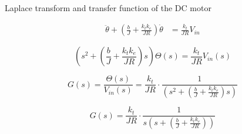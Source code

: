 \subsection{}
{
\begin{frame}{Laplace transform and transfer function of the DC motor}

\begin{equation*}
\begin{split}
\ddot{ \theta} + (\frac{b}{J} + \frac{ k_t k_e }{JR} ) \dot \theta & = \frac{k_t}{JR} V_{in}
\end{split}
\end{equation*}


\begin{equation*}
\left( s^2 + (\frac{b}{J} + \frac{ k_t k_e }{JR})s \right) \Theta(s) =  \frac{k_t}{JR} V_{in}(s)
\end{equation*}


\begin{equation*}
G(s)= \frac{\Theta(s)}{V_{in}(s)} = \frac{k_t}{JR} \cdot \frac{1}{  \left( s^2 + (\frac{b}{J} + \frac{ k_t k_e }{JR})s \right) }
\end{equation*}

\begin{equation}
G(s)=  \frac{k_t}{JR} \cdot \frac{1}{ s  \left( s + (\frac{b}{J} + \frac{ k_t k_e }{JR}) \right) }
\end{equation}



\end{frame}
}




